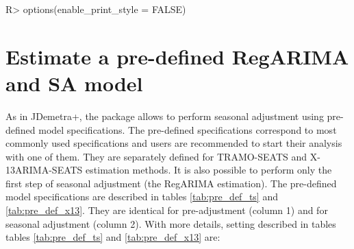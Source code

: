 \documentclass[article]{jss}
\begin{document}
\begin{CodeChunk}

\begin{CodeInput}
R> options(enable_print_style = FALSE)
\end{CodeInput}
\end{CodeChunk}

\hypertarget{pre-def-est}{%
\section{Estimate a pre-defined RegARIMA and SA
model}\label{pre-def-est}}

As in JDemetra+, the  package allows to perform seasonal
adjustment using pre-defined model specifications. The pre-defined
specifications correspond to most commonly used specifications and users
are recommended to start their analysis with one of them. They are
separately defined for TRAMO-SEATS and X-13ARIMA-SEATS estimation
methods. It is also possible to perform only the first step of seasonal
adjustment (the RegARIMA estimation). The pre-defined model
specifications are described in tables \ref{tab:pre_def_ts} and
\ref{tab:pre_def_x13}. They are identical for pre-adjustment (column 1)
and for seasonal adjustment (column 2). With more details, setting
described in tables tables \ref{tab:pre_def_ts} and
\ref{tab:pre_def_x13} are:
\end{document}
